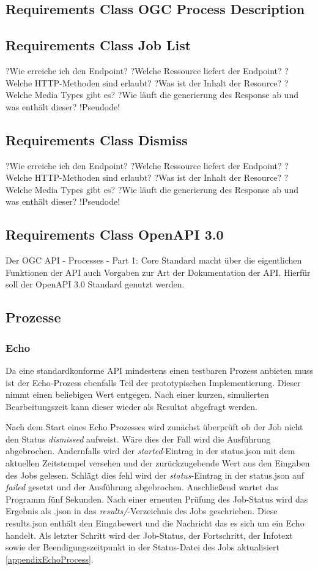\subsection{Requirements Class OGC Process Description}
\subsection{Requirements Class Job List}
?Wie erreiche ich den Endpoint?
?Welche Ressource liefert der Endpoint?
?Welche HTTP-Methoden sind erlaubt?
?Was ist der Inhalt der Resource?
?Welche Media Types gibt es?
?Wie läuft die generierung des Response ab und was enthält dieser?
!Pseudode!
\subsection{Requirements Class Dismiss}
?Wie erreiche ich den Endpoint?
?Welche Ressource liefert der Endpoint?
?Welche HTTP-Methoden sind erlaubt?
?Was ist der Inhalt der Resource?
?Welche Media Types gibt es?
?Wie läuft die generierung des Response ab und was enthält dieser?
!Pseudode!
\subsection{Requirements Class OpenAPI 3.0}
Der OGC API - Processes - Part 1: Core Standard macht über die eigentlichen Funktionen der API auch Vorgaben zur Art der Dokumentation der API. Hierfür soll der 
OpenAPI 3.0 Standard genutzt werden. 
\subsection{Prozesse}
\subsubsection{Echo}
Da eine standardkonforme API mindestens einen testbaren Prozess anbieten muss ist der Echo-Prozess ebenfalls Teil der prototypischen Implementierung. 
Dieser nimmt einen beliebigen Wert entgegen. Nach einer kurzen, simulierten Bearbeitungszeit kann dieser wieder als Resultat abgefragt werden. 

Nach dem Start eines Echo Prozesses wird zunächst überprüft ob der Job nicht den Status \textit{dismissed} aufweist. Wäre dies der Fall wird die Ausführung abgebrochen. 
Andernfalls wird der \textit{started}-Eintrag in der status.json mit dem aktuellen Zeitstempel versehen und der zurückzugebende Wert aus den Eingaben des Jobs gelesen.
Schlägt dies fehl wird der \textit{status}-Eintrag in der status.json auf \textit{failed} gesetzt und der Ausführung abgebrochen. 
Anschließend wartet das Programm fünf Sekunden. Nach einer erneuten Prüfung des Job-Status wird das Ergebnis als .json in das \textit{results/}-Verzeichnis des Jobs geschrieben.
Diese results.json enthält den Eingabewert und die Nachricht das es sich um ein Echo handelt. 
Als letzter Schritt wird der Job-Status, der Fortschritt, der Infotext sowie der Beendigungszeitpunkt in der Status-Datei des Jobs aktualisiert \ref{appendixEchoProcess}. 
